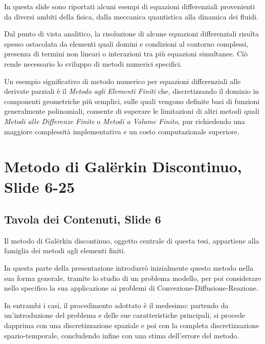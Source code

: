 \documentclass[12pt]{article}
\begin{document}
    In questa slide sono riportati alcuni esempi di equazioni differenziali provenienti da diversi ambiti della fisica, dalla meccanica quantistica alla dinamica dei fluidi.

    Dal punto di vista analitico, la risoluzione di alcune equazioni differenziali risulta spesso ostacolata da elementi quali domini e condizioni al contorno complessi, presenza di termini non lineari o interazioni tra più equazioni simultanee. Ciò rende necessario lo sviluppo di metodi numerici specifici.

    Un esempio significativo di metodo numerico per equazioni differenziali alle derivate parziali è il \textit{Metodo agli Elementi Finiti} che, discretizzando il dominio in componenti geometriche più semplici, sulle quali vengono definite basi di funzioni generalmente polinomiali, consente di superare le limitazioni di altri metodi quali \textit{Metodi alle Differenze Finite} o \textit{Metodi a Volume Finito}, pur richiedendo una maggiore complessità implementativa e un costo computazionale superiore.


    \newpage
    \section{Metodo di Galërkin Discontinuo, Slide 6-25}

    \subsection{Tavola dei Contenuti, Slide 6}

    Il metodo di Galërkin discontinuo, oggetto centrale di questa tesi, appartiene alla famiglia dei metodi agli elementi finiti.

    {\color{gray} In questa parte della presentazione introdurrò inizialmente questo metodo nella sua forma generale, tramite lo studio di un problema modello, per poi considerare nello specifico la sua applicazione ai problemi di Convezione-Diffusione-Reazione.

    In entrambi i casi, il procedimento adottato è il medesimo: partendo da un'introduzione del problema e delle sue caratteristiche principali, si procede dapprima con una discretizzazione spaziale e poi con la completa discretizzazione spazio-temporale, concludendo infine con una stima dell'errore del metodo.}
\end{document}
